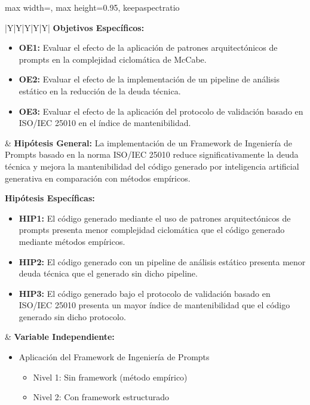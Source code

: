 \begin{landscape}
\begin{adjustbox}{max width=\linewidth, max height=0.95\textheight, keepaspectratio}
\begin{tabularx}{\linewidth}{|Y|Y|Y|Y|Y|}
\textbf{Objetivos Específicos:}
\begin{itemize}[leftmargin=*, nosep, itemsep=6pt]
    \item \textbf{OE1:} Evaluar el efecto de la aplicación de patrones arquitectónicos de prompts en la complejidad ciclomática de McCabe.
    \item \textbf{OE2:} Evaluar el efecto de la implementación de un pipeline de análisis estático en la reducción de la deuda técnica.
    \item \textbf{OE3:} Evaluar el efecto de la aplicación del protocolo de validación basado en ISO/IEC 25010 en el índice de mantenibilidad.
\end{itemize}
&
\textbf{Hipótesis General:} \newline
La implementación de un Framework de Ingeniería de Prompts basado en la norma ISO/IEC 25010 reduce significativamente la deuda técnica y mejora la mantenibilidad del código generado por inteligencia artificial generativa en comparación con métodos empíricos. \newline

\textbf{Hipótesis Específicas:}
\begin{itemize}[leftmargin=*, nosep, itemsep=6pt]
    \item \textbf{HIP1:} El código generado mediante el uso de patrones arquitectónicos de prompts presenta menor complejidad ciclomática que el código generado mediante métodos empíricos.
    \item \textbf{HIP2:} El código generado con un pipeline de análisis estático presenta menor deuda técnica que el generado sin dicho pipeline.
    \item \textbf{HIP3:} El código generado bajo el protocolo de validación basado en ISO/IEC 25010 presenta un mayor índice de mantenibilidad que el código generado sin dicho protocolo.
\end{itemize}
&
\textbf{Variable Independiente:}
\begin{itemize}[leftmargin=*, nosep]
    \item Aplicación del Framework de Ingeniería de Prompts
    \begin{itemize}[nosep]
        \item Nivel 1: Sin framework (método empírico)
        \item Nivel 2: Con framework estructurado
    \end{itemize}
\end{itemize}


\end{tabularx}
\end{adjustbox}
\end{landscape}
